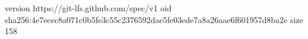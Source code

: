 version https://git-lfs.github.com/spec/v1
oid sha256:4e7ecec8a071c0b5fe3c55c2376592dae5fe03ede7a8a26aae6f601957d8ba2e
size 158
